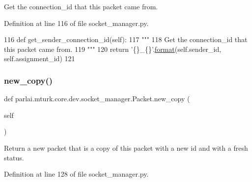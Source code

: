 \begin{DoxyVerb}Get the connection_id that this packet came from.
\end{DoxyVerb}
 

Definition at line 116 of file socket\+\_\+manager.\+py.


\begin{DoxyCode}
116     \textcolor{keyword}{def }get\_sender\_connection\_id(self):
117         \textcolor{stringliteral}{"""}
118 \textcolor{stringliteral}{        Get the connection\_id that this packet came from.}
119 \textcolor{stringliteral}{        """}
120         \textcolor{keywordflow}{return} \textcolor{stringliteral}{'\{\}\_\{\}'}.\hyperlink{namespaceparlai_1_1chat__service_1_1services_1_1messenger_1_1shared__utils_a32e2e2022b824fbaf80c747160b52a76}{format}(self.sender\_id, self.assignment\_id)
121 
\end{DoxyCode}
\mbox{\label{classparlai_1_1mturk_1_1core_1_1dev_1_1socket__manager_1_1Packet_adde61fc0d58a62c2446fe8ea54adb02e}} 
\subsubsection{\texorpdfstring{new\+\_\+copy()}{new\_copy()}}
{\footnotesize\ttfamily def parlai.\+mturk.\+core.\+dev.\+socket\+\_\+manager.\+Packet.\+new\+\_\+copy (\begin{DoxyParamCaption}\item[{}]{self }\end{DoxyParamCaption})}

\begin{DoxyVerb}Return a new packet that is a copy of this packet with a new id and with a fresh
status.
\end{DoxyVerb}
 

Definition at line 128 of file socket\+\_\+manager.\+py.


